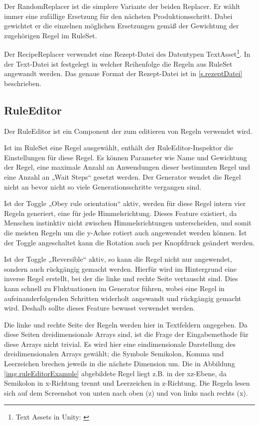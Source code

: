 Der RandomReplacer ist die simplere Variante der beiden Replacer. Er wählt immer eine zufällige Ersetzung für den nächsten Produktionsschritt. Dabei gewichtet er die einzelnen möglichen Ersetzungen gemäß der Gewichtung der zugehörigen Regel im RuleSet.

Der RecipeReplacer verwendet eine Rezept-Datei des Datentypen TextAsset\footnote{Text Assets in Unity: \cite[Seite: class-TextAsset]{unityManual}}. In der Text-Datei ist festgelegt in welcher Reihenfolge die Regeln aus RuleSet angewandt werden. Das genaue Format der Rezept-Datei ist in \ref{s.rezeptDatei} beschrieben.

\subsection{RuleEditor}\label{ss.ruleEditor}

Der RuleEditor ist ein Component der zum editieren von Regeln verwendet wird. 


Ist im RuleSet eine Regel ausgewählt, enthält der RuleEditor-Inspektor die Einstellungen für diese Regel. Es können Parameter wie Name und Gewichtung der Regel, eine maximale Anzahl an Anwendungen dieser bestimmten Regel und eine Anzahl an „Wait Steps“ gesetzt werden. Der Generator wendet die Regel nicht an bevor nicht so viele Generationsschritte vergangen sind.

Ist der Toggle „Obey rule orientation“ aktiv, werden für diese Regel intern vier Regeln generiert, eine für jede Himmelsrichtung. Dieses Feature existiert, da Menschen instinktiv nicht zwischen Himmelsrichtungen unterscheiden, und somit die meisten Regeln um die y-Achse rotiert auch angewendet werden können. Ist der Toggle angeschaltet kann die Rotation auch per Knopfdruck geändert werden. 

Ist der Toggle „Reversible“ aktiv, so kann die Regel nicht nur angewendet, sondern auch rückgängig gemacht werden. Hierfür wird im Hintergrund eine inverse Regel erstellt, bei der die linke und rechte Seite vertauscht sind. Dies kann schnell zu Fluktuationen im Generator führen, wobei eine Regel in aufeinanderfolgenden Schritten widerholt angewandt und rückgängig gemacht wird. Deshalb sollte dieses Feature bewusst verwendet werden.

Die linke und rechte Seite der Regeln werden hier in Textfeldern angegeben. Da diese Seiten dreidimensionale Arrays sind, ist die Frage der Eingabemethode für diese Arrays nicht trivial. Es wird hier eine eindimensionale Darstellung des dreidimensionalen Arrays gewählt; die Symbole Semikolon, Komma und Leerzeichen brechen jeweils in die nächste Dimension um. Die in Abbildung \ref{img.ruleEditorExample} abgebildete Regel liegt z.B. in der xz-Ebene, da Semikolon in x-Richtung trennt und Leerzeichen in z-Richtung. Die Regeln lesen sich auf dem Screenshot von unten nach oben (z) und von links nach rechts (x).


